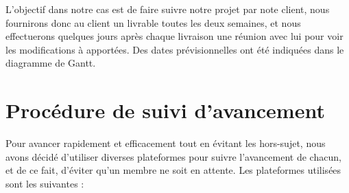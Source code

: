 L'objectif dans notre cas est de faire suivre notre projet par note client,
nous fournirons donc au client un livrable toutes les deux semaines, et nous effectuerons
quelques jours après chaque livraison une réunion avec lui pour voir les modifications à
apportées. Des dates prévisionnelles ont été indiquées dans le diagramme de Gantt.

\chapter{Procédure de suivi d'avancement}

Pour avancer rapidement et efficacement tout en évitant les hors-sujet, nous avons
décidé d’utiliser diverses plateformes pour suivre l’avancement de chacun, et de ce fait,
d’éviter qu’un membre ne soit en attente. Les plateformes utilisées sont les suivantes :\\ \newline


